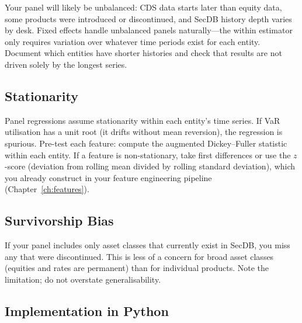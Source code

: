 Your panel will likely be unbalanced: CDS data starts later than equity data, some products were introduced or discontinued, and SecDB history depth varies by desk.
Fixed effects handle unbalanced panels naturally---the within estimator only requires variation over whatever time periods exist for each entity.
Document which entities have shorter histories and check that results are not driven solely by the longest series.

\subsection{Stationarity}

Panel regressions assume stationarity within each entity's time series.
If VaR utilisation has a unit root (it drifts without mean reversion), the regression is spurious.
Pre-test each feature: compute the augmented Dickey--Fuller statistic within each entity.
If a feature is non-stationary, take first differences or use the $z$-score (deviation from rolling mean divided by rolling standard deviation), which you already construct in your feature engineering pipeline (Chapter~\ref{ch:features}).

\subsection{Survivorship Bias}

If your panel includes only asset classes that currently exist in SecDB, you miss any that were discontinued.
This is less of a concern for broad asset classes (equities and rates are permanent) than for individual products.
Note the limitation; do not overstate generalisability.

\subsection{Implementation in Python}

